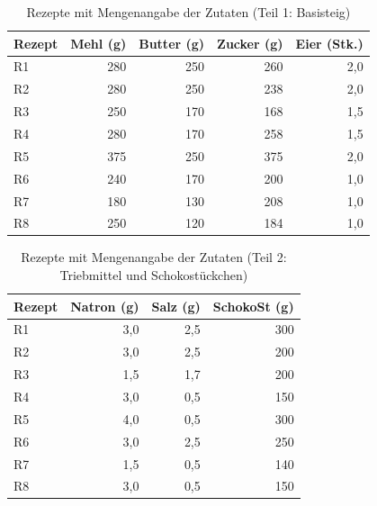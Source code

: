 \begin{table}[H]
\centering
\caption{Rezepte mit Mengenangabe der Zutaten (Teil 1: Basisteig)}
\label{table:rezepte_1}
\small
\begin{tabular}{|l|r|r|r|r|}
\hline
Rezept & Mehl (g) & Butter (g) & Zucker (g) & Eier (Stk.) \\
\hline
R1     & 280      & 250        & 260        & 2,0         \\
R2     & 280      & 250        & 238        & 2,0         \\
R3     & 250      & 170        & 168        & 1,5         \\
R4     & 280      & 170        & 258        & 1,5         \\
R5     & 375      & 250        & 375        & 2,0         \\
R6     & 240      & 170        & 200        & 1,0         \\
R7     & 180      & 130        & 208        & 1,0         \\
R8     & 250      & 120        & 184        & 1,0         \\
\hline
\end{tabular}
\end{table}

\begin{table}[H]
\centering
\caption{Rezepte mit Mengenangabe der Zutaten (Teil 2: Triebmittel und Schokostückchen)}
\label{table:rezepte_2}
\small
\begin{tabular}{|l|r|r|r|}
\hline
Rezept & Natron (g) & Salz (g) & SchokoSt (g) \\
\hline
R1     & 3,0        & 2,5      & 300          \\
R2     & 3,0        & 2,5      & 200          \\
R3     & 1,5        & 1,7      & 200          \\
R4     & 3,0        & 0,5      & 150          \\
R5     & 4,0        & 0,5      & 300          \\
R6     & 3,0        & 2,5      & 250          \\
R7     & 1,5        & 0,5      & 140          \\
R8     & 3,0        & 0,5      & 150          \\
\hline
\end{tabular}
\end{table}


